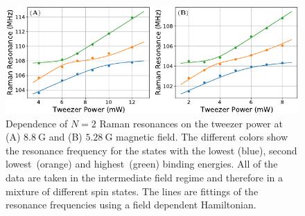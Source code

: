 \begin{figure}
  \centering
  \includegraphics[width=\textwidth]{figures/raman_spectroscopy_n2_fit.pdf}
  \caption[$N=2$ Raman resonances and fitting to external field strengths.]{
    Dependence of $N=2$ Raman resonances on the tweezer power at
    (A) $8.8~\mathrm{G}$ and (B) $5.28~\mathrm{G}$ magnetic field.
    The different colors show the resonance frequency for the states with
    the lowest (blue), second lowest~(orange) and highest~(green) binding energies.
    All of the data are taken in the intermediate field regime
    and therefore in a mixture of different spin states.
    The lines are fittings of the resonance frequencies using a field dependent Hamiltonian.
    \label{fig:raman-spectroscopy:n2-fit}}
\end{figure}

